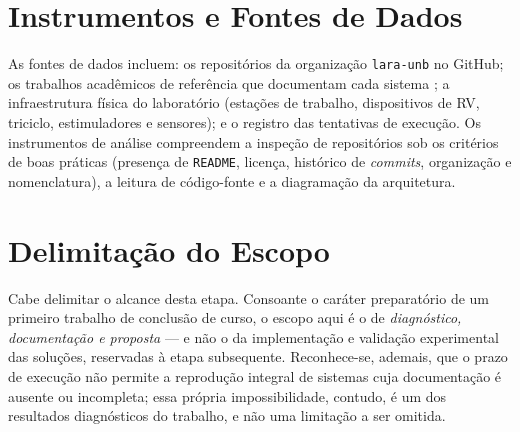\section{Instrumentos e Fontes de Dados}

As fontes de dados incluem: os repositórios da organização \texttt{lara-unb} no GitHub; os
trabalhos acadêmicos de referência que documentam cada sistema
\cite{balbino2020,brindeiro2017,baptista2022}; a infraestrutura física do laboratório
(estações de trabalho, dispositivos de RV, triciclo, estimuladores e sensores); e o
registro das tentativas de execução. Os instrumentos de análise compreendem a inspeção de
repositórios sob os critérios de boas práticas (presença de \texttt{README}, licença,
histórico de \emph{commits}, organização e nomenclatura), a leitura de código-fonte e a
diagramação da arquitetura.

\section{Delimitação do Escopo}

Cabe delimitar o alcance desta etapa. Consoante o caráter preparatório de um primeiro
trabalho de conclusão de curso, o escopo aqui é o de \emph{diagnóstico, documentação e
proposta} --- e não o da implementação e validação experimental das soluções, reservadas à
etapa subsequente. Reconhece-se, ademais, que o prazo de execução não permite a reprodução
integral de sistemas cuja documentação é ausente ou incompleta; essa própria
impossibilidade, contudo, é um dos resultados diagnósticos do trabalho, e não uma limitação
a ser omitida.

